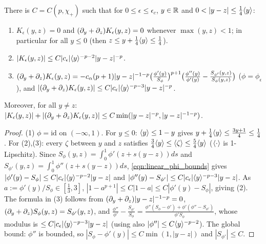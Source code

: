 \begin{lemma}
  \label{lem:c08_R2_kernel_near}
  There is $C=C(p,\chi_+)$ such that for $0\le\epsilon\le\epsilon_c$, $y\in\mathbb{R}$ and $0<|y-z|\le\frac14\ang{y}$:
  \begin{enumerate}
    \item $K_\epsilon(y,z)=0$ and $(\partial_y+\partial_z)K_\epsilon(y,z)=0$ whenever $\max(y,z)<1$; in particular for all $y\le0$
      (then $z\le y+\frac14\langle y \rangle\le\frac14$).
    \item $|K_\epsilon(y,z)|\le C|c_\epsilon|\langle y \rangle^{-p-2}|y-z|^{-p}$.
    \item $(\partial_y+\partial_z)K_\epsilon(y,z)=-c_\alpha(p+1)|y-z|^{-1-p}\bigl(\frac{\phi'(y)}{S_\phi}\bigr)^{p+1}
      \bigl(\frac{\phi''(y)}{\phi'(y)}-\frac{S_{\phi'}(y,z)}{S_\phi(y,z)}\bigr)$ ($\phi=\phi_\epsilon$), and
      $|(\partial_y+\partial_z)K_\epsilon(y,z)|\le C|c_\epsilon|\langle y \rangle^{-p-3}|y-z|^{-p}$.
  \end{enumerate}
  Moreover, for all $y\neq z$: $|K_\epsilon(y,z)|+|(\partial_y+\partial_z)K_\epsilon(y,z)|\le C\min(|y-z|^{-p},|y-z|^{-1-p})$.
\end{lemma}
\begin{proof}
  (1) $\phi=\mathrm{id}$ on $(-\infty,1)$. For $y\le0$: $\langle y \rangle\le1-y$ gives $y+\frac14\langle y \rangle\le\frac{3y+1}4\le\frac14$.
  For (2),(3): every $\zeta$ between $y$ and $z$ satisfies $\frac34\langle y \rangle\le\langle \zeta \rangle\le\frac54\langle y \rangle$
  ($\langle \cdot \rangle$ is 1-Lipschitz). Since $S_\phi(y,z)=\int_0^1\phi'(z+s(y-z))ds$ and
  $S_{\phi'}(y,z)=\int_0^1\phi''(z+s(y-z))ds$, \eqref{eqn:linear_phi_bounds} gives
  $|\phi'(y)-S_\phi|\le C|c_\epsilon|\langle y \rangle^{-p-2}|y-z|$ and $|\phi''(y)-S_{\phi'}|\le C|c_\epsilon|\langle y \rangle^{-p-3}|y-z|$.
  As $a:=\phi'(y)/S_\phi\in[\frac13,3]$, $|1-a^{p+1}|\le C|1-a|\le C|\phi'(y)-S_\phi|$, giving (2). The formula in (3)
  follows from $(\partial_y+\partial_z)|y-z|^{-1-p}=0$, $(\partial_y+\partial_z)S_\phi(y,z)=S_{\phi'}(y,z)$, and
  $\frac{\phi''}{\phi'}-\frac{S_{\phi'}}{S_\phi}=\frac{\phi''(S_\phi-\phi')+\phi'(\phi''-S_{\phi'})}{\phi'S_\phi}$, whose modulus is
  $\le C|c_\epsilon|\langle y \rangle^{-p-3}|y-z|$ (using also $|\phi''|\le C\langle y \rangle^{-p-2}$). The global bound: $\phi''$ is bounded,
  so $|S_\phi-\phi'(y)|\le C\min(1,|y-z|)$ and $|S_{\phi'}|\le C$.
\end{proof}

